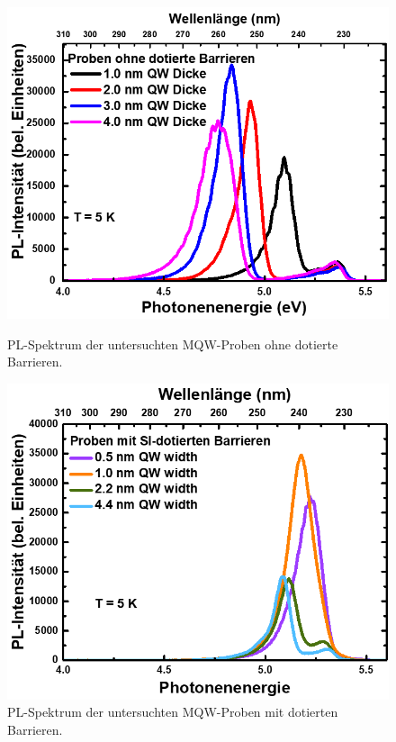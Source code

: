 \begin{figure}[H]
  \centering
  \begin{minipage}[t]{0.49\textwidth}
    \centering
    \includegraphics[width=\textwidth]{Bilder/MQWdickenSerie/spektrumUndotiert}
		\caption{PL-Spektrum der untersuchten MQW-Proben ohne dotierte Barrieren.}
    \label{fig:undotiertSpektrum}
  \end{minipage}
	\hfill
  \begin{minipage}[t]{0.49\textwidth}
    \centering
    \includegraphics[width=\linewidth]{Bilder/MQWdickenSerie/spektrumDotiert}
		\caption{PL-Spektrum der untersuchten MQW-Proben mit dotierten Barrieren.}
    \label{fig:dotiertSpektrum}
  \end{minipage}
\end{figure}
